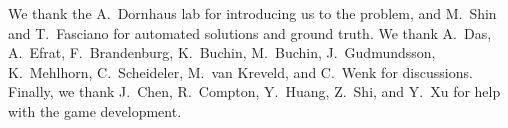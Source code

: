 \documentclass{llncs}
\begin{document}
\medskip{}
We thank the A.~Dornhaus lab for introducing us to the
problem, and M.~Shin and T.~Fasciano for automated solutions and ground truth. We thank A.~Das, A.~Efrat, F.~Brandenburg, K.~Buchin, M.~Buchin, J.~Gudmundsson, K.~Mehlhorn, C.~Scheideler, M.~van
Kreveld, and C.~Wenk for discussions.
Finally, we thank J.~Chen, R.~Compton, Y.~Huang, Z.~Shi, and
Y.~Xu for help with the game development.




\end{document}
